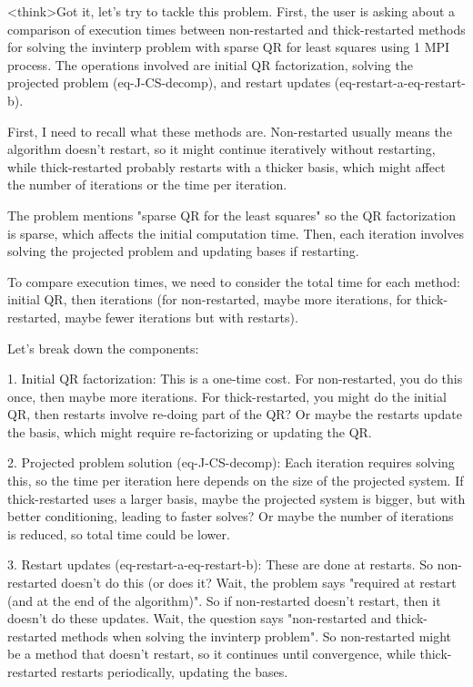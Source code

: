 <think>Got it, let's try to tackle this problem. First, the user is asking about a comparison of execution times between non-restarted and thick-restarted methods for solving the invinterp problem with sparse QR for least squares using 1 MPI process. The operations involved are initial QR factorization, solving the projected problem (eq-J-CS-decomp), and restart updates (eq-restart-a-eq-restart-b). 

First, I need to recall what these methods are. Non-restarted usually means the algorithm doesn't restart, so it might continue iteratively without restarting, while thick-restarted probably restarts with a thicker basis, which might affect the number of iterations or the time per iteration. 

The problem mentions "sparse QR for the least squares" so the QR factorization is sparse, which affects the initial computation time. Then, each iteration involves solving the projected problem and updating bases if restarting. 

To compare execution times, we need to consider the total time for each method: initial QR, then iterations (for non-restarted, maybe more iterations, for thick-restarted, maybe fewer iterations but with restarts). 

Let's break down the components:

1. Initial QR factorization: This is a one-time cost. For non-restarted, you do this once, then maybe more iterations. For thick-restarted, you might do the initial QR, then restarts involve re-doing part of the QR? Or maybe the restarts update the basis, which might require re-factorizing or updating the QR. 

2. Projected problem solution (eq-J-CS-decomp): Each iteration requires solving this, so the time per iteration here depends on the size of the projected system. If thick-restarted uses a larger basis, maybe the projected system is bigger, but with better conditioning, leading to faster solves? Or maybe the number of iterations is reduced, so total time could be lower. 

3. Restart updates (eq-restart-a-eq-restart-b): These are done at restarts. So non-restarted doesn't do this (or does it? Wait, the problem says "required at restart (and at the end of the algorithm)". So if non-restarted doesn't restart, then it doesn't do these updates. Wait, the question says "non-restarted and thick-restarted methods when solving the invinterp problem". So non-restarted might be a method that doesn't restart, so it continues until convergence, while thick-restarted restarts periodically, updating the bases. 

